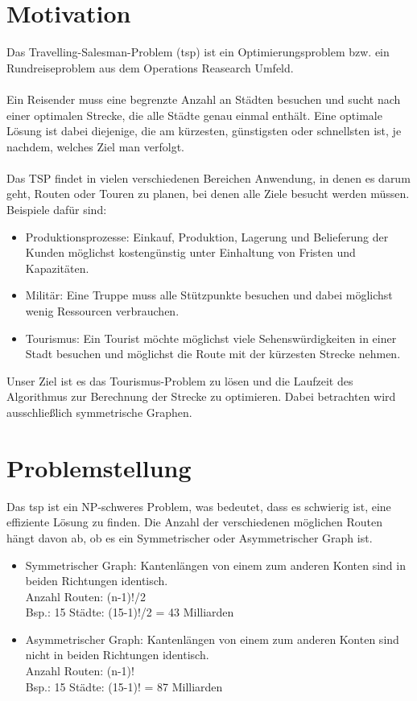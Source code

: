 \section{Motivation}
Das Travelling-Salesman-Problem (\acs*{tsp}) ist ein Optimierungsproblem bzw. ein Rundreiseproblem aus dem Operations Reasearch Umfeld.
\\\\
Ein Reisender muss eine begrenzte Anzahl an Städten besuchen und sucht nach einer optimalen Strecke, die alle Städte genau einmal enthält. 
Eine optimale Lösung ist dabei diejenige, die am kürzesten, günstigsten oder schnellsten ist, je nachdem, welches Ziel man verfolgt. \cite*{TravellingSalesmanProblemProblemHandlungsreisenden}
\\\\
Das TSP findet in vielen verschiedenen Bereichen Anwendung, in denen es darum geht, Routen oder Touren zu planen, bei denen alle Ziele besucht werden müssen. \\
Beispiele dafür sind:
\begin{itemize}
    \item Produktionsprozesse:
            Einkauf, Produktion, Lagerung und Belieferung der Kunden möglichst kostengünstig unter Einhaltung von Fristen und Kapazitäten.
    \item Militär:
            Eine Truppe muss alle Stützpunkte besuchen und dabei möglichst wenig Ressourcen verbrauchen. 
    \item Tourismus:
            Ein Tourist möchte möglichst viele Sehenswürdigkeiten in einer Stadt besuchen und möglichst die Route mit der kürzesten Strecke nehmen.
\end{itemize}

\noindent Unser Ziel ist es das Tourismus-Problem zu lösen und die Laufzeit des Algorithmus zur Berechnung der Strecke zu optimieren.
Dabei betrachten wird ausschließlich symmetrische Graphen.

\section{Problemstellung}
Das \acs*{tsp} ist ein NP-schweres Problem, was bedeutet, dass es schwierig ist, eine effiziente Lösung zu finden. 
Die Anzahl der verschiedenen möglichen Routen hängt davon ab, ob es ein Symmetrischer oder Asymmetrischer Graph ist.\cite*{gmbhTravelingSalesmanProblemOperationsResearch}

\begin{itemize}
    \item Symmetrischer Graph: Kantenlängen von einem zum anderen Konten sind in beiden Richtungen identisch.\\
            Anzahl Routen: (n-1)!/2\\
            Bsp.:   15 Städte: (15-1)!/2 = 43 Milliarden
    \item Asymmetrischer Graph: Kantenlängen von einem zum anderen Konten sind nicht in beiden Richtungen identisch.\\
            Anzahl Routen: (n-1)!\\
            Bsp.:   15 Städte: (15-1)! = 87 Milliarden
\end{itemize}

